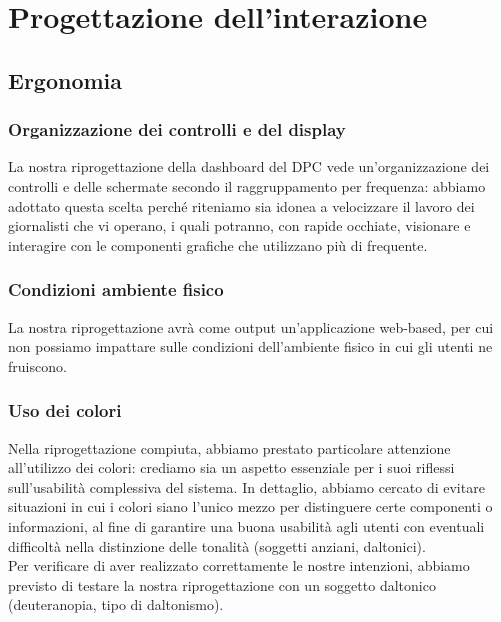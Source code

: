 \section{Progettazione dell'interazione}
\label{s:approccio-interaction-design}

\subsection{Ergonomia}
\label{ss:ergonomia}

\subsubsection{Organizzazione dei controlli e del display}
\label{sss:organizzazione-controlli-display}
La nostra riprogettazione della dashboard del DPC vede un'organizzazione dei controlli e delle schermate secondo il raggruppamento per frequenza: abbiamo adottato questa scelta perché riteniamo sia idonea a velocizzare il lavoro dei giornalisti che vi operano, i quali potranno, con rapide occhiate, visionare e interagire con le componenti grafiche che utilizzano più di frequente.

\subsubsection{Condizioni ambiente fisico}
\label{sss:condizioni-ambiente-fisico}
La nostra riprogettazione avrà come output un'applicazione web-based, per cui non possiamo impattare sulle condizioni dell'ambiente fisico in cui gli utenti ne fruiscono.

\subsubsection{Uso dei colori}
\label{sss:uso-colori}
Nella riprogettazione compiuta, abbiamo prestato particolare attenzione all'utilizzo dei colori: crediamo sia un aspetto essenziale per i suoi riflessi sull'usabilità complessiva del sistema. In dettaglio, abbiamo cercato di evitare situazioni in cui i colori siano l'unico mezzo per distinguere certe componenti o informazioni, al fine di garantire una buona usabilità agli utenti con eventuali difficoltà nella distinzione delle tonalità (soggetti anziani, daltonici).\\
Per verificare di aver realizzato correttamente le nostre intenzioni, abbiamo previsto di testare la nostra riprogettazione con un soggetto daltonico (deuteranopia, tipo di daltonismo).  

